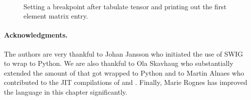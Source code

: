 \begin{figure}
   \\
\caption{Setting a breakpoint after tabulate tensor and printing out the first element matrix entry.}
\label{fig5}
\end{figure}

\paragraph{Acknowledgments.}
The authors are very thankful to Johan Jansson who initiated the use of
SWIG to wrap \dolfin to Python. We are also thankful to Ola Skavhaug who
substantially extended the amount of \dolfin that got wrapped to Python and
to Martin Alnaes who contributed to the JIT compilations of
 and . 
Finally, Marie Rognes has improved the language in this chapter significantly. 

